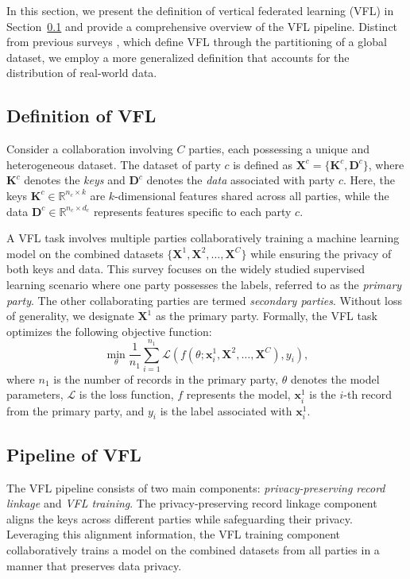 In this section, we present the definition of vertical federated learning (VFL) in Section~\ref{subsec:vfl-def} and provide a comprehensive overview of the VFL pipeline. Distinct from previous surveys \cite{liu2024vertical}, which define VFL through the partitioning of a global dataset, we employ a more generalized definition that accounts for the distribution of real-world data.

\subsection{Definition of VFL}\label{subsec:vfl-def}
Consider a collaboration involving \( C \) parties, each possessing a unique and heterogeneous dataset. The dataset of party \( c \) is defined as \( \mathbf{X}^c = \{\mathbf{K}^c, \mathbf{D}^c\} \), where \(\mathbf{K}^c \) denotes the \textit{keys} and \(\mathbf{D}^c \) denotes the \textit{data} associated with party \( c \). Here, the keys \( \mathbf{K}^c \in \mathbb{R}^{n_c \times k} \) are \( k \)-dimensional features shared across all parties, while the data \( \mathbf{D}^c \in \mathbb{R}^{n_c \times d_c} \) represents features specific to each party \( c \).


A VFL task involves multiple parties collaboratively training a machine learning model on the combined datasets \(\{\mathbf{X}^1, \mathbf{X}^2, \ldots, \mathbf{X}^C\}\) while ensuring the privacy of both keys and data. This survey focuses on the widely studied supervised learning scenario where one party possesses the labels, referred to as the \textit{primary party}. The other collaborating parties are termed \textit{secondary parties}. Without loss of generality, we designate $\mathbf{X}^1$ as the primary party. Formally, the VFL task optimizes the following objective function:
\begin{equation}\label{eq:vfl-obj}
\min_{\theta} \frac{1}{n_1} \sum_{i=1}^{n_1} \mathcal{L}(f(\theta; \mathbf{x}_i^1, \mathbf{X}^2, \ldots, \mathbf{X}^C), y_i),
\end{equation}
where $n_1$ is the number of records in the primary party, $\theta$ denotes the model parameters, $\mathcal{L}$ is the loss function, $f$ represents the model, $\mathbf{x}_i^1$ is the $i$-th record from the primary party, and $y_i$ is the label associated with $\mathbf{x}_i^1$.



\subsection{Pipeline of VFL}
The VFL pipeline consists of two main components: \textit{privacy-preserving record linkage} and \textit{VFL training}. The privacy-preserving record linkage component aligns the keys across different parties while safeguarding their privacy. Leveraging this alignment information, the VFL training component collaboratively trains a model on the combined datasets from all parties in a manner that preserves data privacy.




